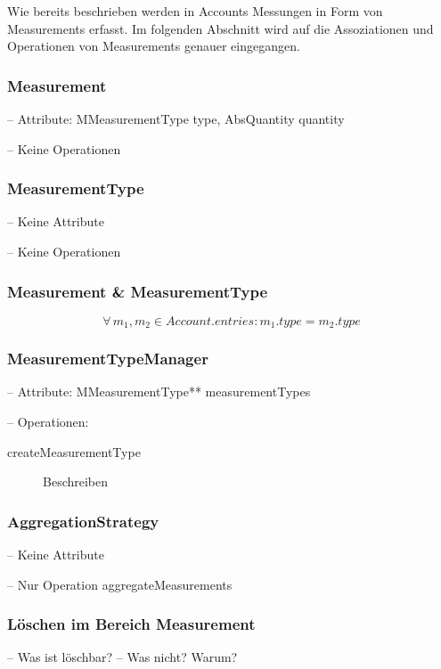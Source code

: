 Wie bereits beschrieben werden in Accounts Messungen in Form von Measurements erfasst. 
Im folgenden Abschnitt wird auf die Assoziationen und Operationen von Measurements genauer eingegangen.


\subsubsection{Measurement}


-- Attribute: MMeasurementType type, AbsQuantity quantity

-- Keine Operationen


\subsubsection{MeasurementType}


-- Keine Attribute

-- Keine Operationen


\subsubsection{Measurement \& MeasurementType}

\begin{equation} \forall \, m_1, m_2 \in Account.entries: m_1.type = m_2.type
\end{equation}


\subsubsection{MeasurementTypeManager}


-- Attribute: MMeasurementType** measurementTypes

-- Operationen:

\begin{description}
	\item[createMeasurementType] Beschreiben
\end{description}


\subsubsection{AggregationStrategy}


-- Keine Attribute

-- Nur Operation aggregateMeasurements


\subsubsection{Löschen im Bereich Measurement}


-- Was ist löschbar?
-- Was nicht? Warum?